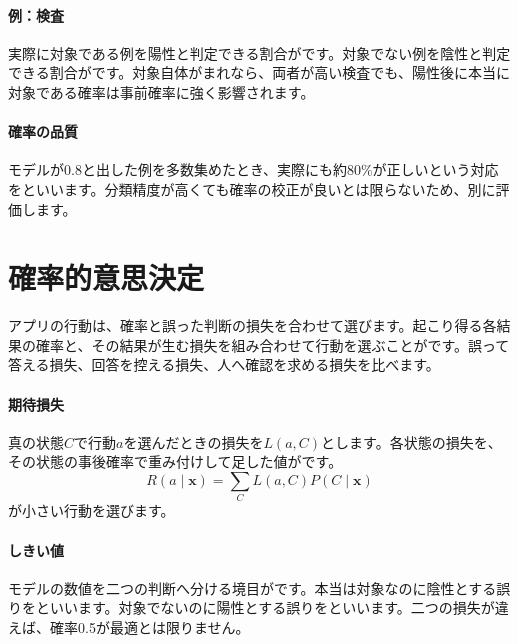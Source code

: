 \par
\endgroup
\medskip
\begingroup
\paragraph{例：検査}
        実際に対象である例を陽性と判定できる割合がです。対象でない例を陰性と判定できる割合がです。対象自体がまれなら、両者が高い検査でも、陽性後に本当に対象である確率は事前確率に強く影響されます。

\paragraph{確率の品質}
        モデルが0.8と出した例を多数集めたとき、実際にも約80\%が正しいという対応をといいます。分類精度が高くても確率の校正が良いとは限らないため、別に評価します。

\par
\endgroup
\par
\endgroup


\section{確率的意思決定}
\label{sec:06-machine-learning-13}

アプリの行動は、確率と誤った判断の損失を合わせて選びます。起こり得る各結果の確率と、その結果が生む損失を組み合わせて行動を選ぶことがです。誤って答える損失、回答を控える損失、人へ確認を求める損失を比べます。

\begingroup
\begingroup
\paragraph{期待損失}
        真の状態$C$で行動$a$を選んだときの損失を$L(a,C)$とします。各状態の損失を、その状態の事後確率で重み付けして足した値がです。
        \[
          R(a\mid\mathbf{x})=
          \sum_C L(a,C)P(C\mid\mathbf{x})
        \]
        が小さい行動を選びます。

\par
\endgroup
\medskip
\begingroup
\paragraph{しきい値}
        モデルの数値を二つの判断へ分ける境目がです。本当は対象なのに陰性とする誤りをといいます。対象でないのに陽性とする誤りをといいます。二つの損失が違えば、確率0.5が最適とは限りません。

